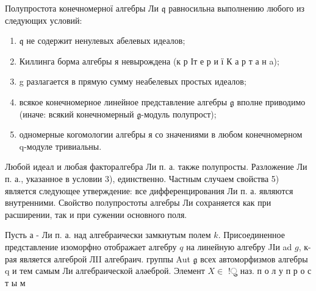 \documentclass[10pt]{article}
\begin{document}
Полупростота конечномерної алгебры Ли $\mathfrak{q}$ равносильна выполнению любого из следующих условий:



\begin{enumerate}

  \item $\mathfrak{q}$ не содержит ненулевых абелевых идеалов;



  \item Киллинга борма алгебры я невырождена (к р Іт е р и ї К а р т а н a);



  \item g разлагается в прямую сумму неабелевых простых идеалов;



  \item всякое конечномерное линейное представление алгебры $\mathfrak{g}$ вполне приводимо (иначе: всякий конечномерный $\mathfrak{g}$-модуль полупрост);



  \item одномерные когомологии алгебры я со значениями в любом конечномерном q-модуле тривиальны.



\end{enumerate}



Любой идеал и любая факторалгебра Ли п. а. также полупросты. Разложение Ли п. а., указанное в условии 3), единственно. Частным случаем свойства 5) является следующее утверждение: все дифференцирования Ли п. а. являются внутренними. Свойство полупростоты алгебры Ли сохраняется как при расширении, так и при сужении основного поля.



Пусть а - Ли п. а. над алгебраически замкнутым полем $k$. Присоединенное представление изоморфно отображает алгебру $q$ на линейную алгебру JІи ad $g$, к-рая является алгеброй ЛII алгебраич. группы Aut $\mathfrak{g}$ всех автоморфизмов алгебры q и тем самым Ли алгебраической аләеброй. Элемент $X \in$ !ु наз. п о л у п р о с т ы м
\end{document}

